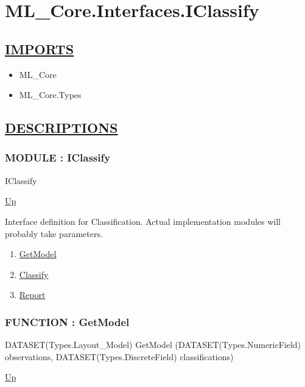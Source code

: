 \chapter*{ML\_Core.Interfaces.IClassify}
\hypertarget{ecldoc:toc:ML_Core.Interfaces.IClassify}{}

\section*{\underline{IMPORTS}}
\begin{itemize}
\item ML\_Core
\item ML\_Core.Types
\end{itemize}

\section*{\underline{DESCRIPTIONS}}
\subsection*{MODULE : IClassify}
\hypertarget{ecldoc:ML_Core.Interfaces.IClassify}{}
\begin{minipage}[t]{\textwidth}
\begin{flushleft}
 IClassify 
\end{flushleft}
\end{minipage}
\hyperlink{ecldoc:toc:ML_Core/Interfaces}{Up}

\par
Interface definition for Classification. Actual implementation modules will probably take parameters.
\par
\begin{enumerate}
\item \hyperlink{ecldoc:ml_core.interfaces.iclassify.getmodel}{GetModel}
\item \hyperlink{ecldoc:ml_core.interfaces.iclassify.classify}{Classify}
\item \hyperlink{ecldoc:ml_core.interfaces.iclassify.report}{Report}
\end{enumerate}
\subsection*{FUNCTION : GetModel}
\hypertarget{ecldoc:ml_core.interfaces.iclassify.getmodel}{}
\begin{minipage}[t]{\textwidth}
\begin{flushleft}
DATASET(Types.Layout\_Model) GetModel (DATASET(Types.NumericField) observations, DATASET(Types.DiscreteField) classifications)
\end{flushleft}
\end{minipage}
\hyperlink{ecldoc:ML_Core.Interfaces.IClassify}{Up}

